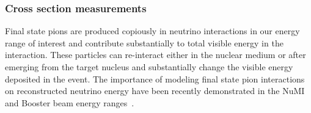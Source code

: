 % 
%


\subsubsection{Cross section measurements}


Final state pions are produced copiously in neutrino interactions in our energy range 
of interest
and contribute substantially to total visible energy in the interaction.
These particles can re-interact either in the nuclear medium or after emerging from the target nucleus
and substantially change the visible energy deposited in the event. 
The importance of modeling final state pion interactions on reconstructed neutrino energy have 
been recently demonstrated in the NuMI and Booster beam energy ranges~\cite{miniboonefsi, minervafsi}. 

